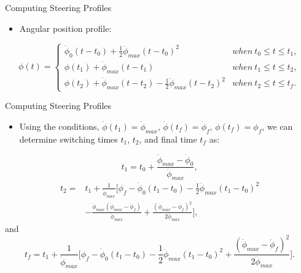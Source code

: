 \documentclass{beamer}
\begin{document}
\begin{frame}{Computing Steering Profiles}
\begin{block}{ }
{\begin{itemize}
\item Angular position profile:
\end{itemize}
 \begin{equation}\label{phi_cons}
 \phi(t)=\left\{
                \begin{array}{ll}
                \dot{\phi}_0(t-t_0)+\frac{1}{2}\ddot{\phi}_{max}(t-t_0)^2& {\scriptstyle when} \  t_0\leq t\leq t_1,\\
                \phi(t_1)+ \dot{\phi}_{max}(t-t_1)& {\scriptstyle when} \  t_1\leq t \leq t_2,\\
                 \phi(t_2)+\dot{\phi}_{max}(t-t_2)-\frac{1}{2}\ddot{\phi}_{max}(t-t_2)^2& {\scriptstyle when} \ t_2\leq t\leq t_f.
                \end{array}
              \right.
 \end{equation}
}
\end{block}
\end{frame}
%
%
\begin{frame}{Computing Steering Profiles}

\begin{block}{ }
\begin{itemize}
\item Using the conditions, $\dot{\phi}(t_1)=\dot{\phi}_{max}$, $\dot{\phi}(t_f)=\dot{\phi}_f$, $\phi(t_f)=\phi_f$, we can determine switching times $t_1$, $t_2$, and final time $t_f$ as:
\end{itemize}
 \begin{equation}\label{t1cons}
t_1=t_0+\frac{\dot{\phi}_{max}-\dot{\phi}_0}{\ddot{\phi}_{max}},
 \end{equation}
 \begin{equation}\label{t2cons}
 \begin{split}
 t_2=&t_1+\frac{1}{\dot{\phi}_{max}}\Big[ \phi_f-\dot{\phi}_0(t_1-t_0)-\frac{1}{2}\ddot{\phi}_{max}(t_1-t_0)^2\\
 &-\frac{\dot{\phi}_{max}(\dot{\phi}_{max}-\dot{\phi}_f)}{\ddot{\phi}_{max}}+\frac{(\dot{\phi}_{max}-\dot{\phi}_f)^2}{2\ddot{\phi}_{max}} \Big],
 \end{split}
 \end{equation}
and
  \begin{equation}\label{tfcons}
 t_f=t_1+\frac{1}{\dot{\phi}_{max}}\Big[ \phi_f-\dot{\phi}_0(t_1-t_0)-\frac{1}{2}\ddot{\phi}_{max}(t_1-t_0)^2+\frac{(\dot{\phi}_{max}-\dot{\phi}_f)^2}{2\ddot{\phi}_{max}} \Big].
 \end{equation}
\end{block}
\end{frame}
\end{document}
